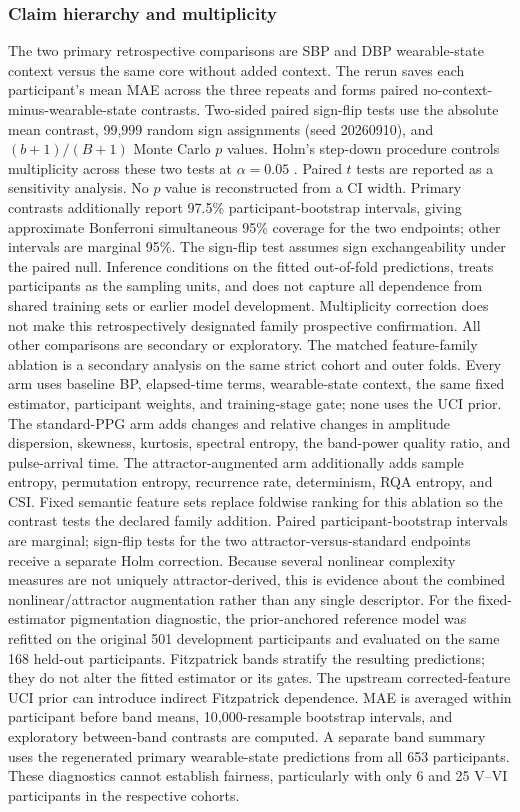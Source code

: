 \documentclass[journal]{IEEEtran}
\begin{document}
\subsubsection{Claim hierarchy and multiplicity}
The two primary retrospective comparisons are SBP and DBP wearable-state context versus the same core without added context. The rerun saves each participant's mean MAE across the three repeats and forms paired no-context-minus-wearable-state contrasts. Two-sided paired sign-flip tests use the absolute mean contrast, 99{,}999 random sign assignments (seed 20260910), and $(b+1)/(B+1)$ Monte Carlo $p$ values. Holm's step-down procedure controls multiplicity across these two tests at $\alpha=0.05$ \cite{holm1979}. Paired $t$ tests are reported as a sensitivity analysis. No $p$ value is reconstructed from a CI width. Primary contrasts additionally report 97.5\% participant-bootstrap intervals, giving approximate Bonferroni simultaneous 95\% coverage for the two endpoints; other intervals are marginal 95\%. The sign-flip test assumes sign exchangeability under the paired null. Inference conditions on the fitted out-of-fold predictions, treats participants as the sampling units, and does not capture all dependence from shared training sets or earlier model development. Multiplicity correction does not make this retrospectively designated family prospective confirmation. All other comparisons are secondary or exploratory.
The matched feature-family ablation is a secondary analysis on the same strict cohort and outer folds. Every arm uses baseline BP, elapsed-time terms, wearable-state context, the same fixed estimator, participant weights, and training-stage gate; none uses the UCI prior. The standard-PPG arm adds changes and relative changes in amplitude dispersion, skewness, kurtosis, spectral entropy, the band-power quality ratio, and pulse-arrival time. The attractor-augmented arm additionally adds sample entropy, permutation entropy, recurrence rate, determinism, RQA entropy, and CSI. Fixed semantic feature sets replace foldwise ranking for this ablation so the contrast tests the declared family addition. Paired participant-bootstrap intervals are marginal; sign-flip tests for the two attractor-versus-standard endpoints receive a separate Holm correction. Because several nonlinear complexity measures are not uniquely attractor-derived, this is evidence about the combined nonlinear/attractor augmentation rather than any single descriptor.
For the fixed-estimator pigmentation diagnostic, the prior-anchored reference model was refitted on the original 501 development participants and evaluated on the same 168 held-out participants. Fitzpatrick bands stratify the resulting predictions; they do not alter the fitted estimator or its gates. The upstream corrected-feature UCI prior can introduce indirect Fitzpatrick dependence. MAE is averaged within participant before band means, 10{,}000-resample bootstrap intervals, and exploratory between-band contrasts are computed. A separate band summary uses the regenerated primary wearable-state predictions from all 653 participants. These diagnostics cannot establish fairness, particularly with only 6 and 25 V--VI participants in the respective cohorts.
\end{document}
